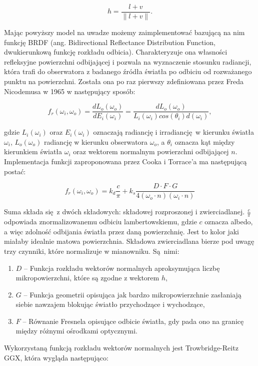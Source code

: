 $$
	h= \frac{l + v}{\|l + v\|}.
	\label{halfway}
$$

	
Mając powyższy model na uwadze możemy zaimplementować bazującą na nim funkcję BRDF (ang. Bidirectional Reflectance Distribution Function, dwukierunkową funkcję rozkładu odbicia). Charakteryzuje ona własności refleksyjne powierzchni odbijającej i pozwala na wyznaczenie stosunku radiancji, która trafi do obserwatora z badanego źródła światła po odbiciu od rozważanego punktu na powierzchni. Została ona po raz pierwszy zdefiniowana przez Freda Nicodemusa w 1965 \cite{Nicodemus} w następujący sposób:

$$
	f_r(\omega_i, \omega_o) = \frac{dL_o(\omega_o)}{dE_i(\omega_i)} = \frac{dL_o(\omega_o)}{L_i(\omega_i) cos(\theta_i) d(\omega_i)},
$$

gdzie $L_i(\omega_i)$ oraz $E_i(\omega_i)$ oznaczają radiancję i irradiancję w kierunku światła $\omega_i$, $L_o(\omega_o)$ radiancję w kierunku obserwatora $\omega_o$, a $\theta_i$ oznacza kąt między kierunkiem światła $\omega_i$ oraz wektorem normalnym powierzchni odbijającej $n$. 
\\ 

Implementacja funkcji zaproponowana przez Cooka i Torrace'a ma następującą postać:

$$
f_r(\omega_i, \omega_o) = k_d \frac{c}{\pi} + k_s\frac{D \cdot F \cdot G}{4\left(\omega_o \cdot n \right) \left( \omega_i \cdot n \right)}
$$

Suma składa się z dwóch składowych: składowej rozproszonej i zwierciadlanej. $\frac{c}{\pi}$ odpowiada znormalizowanemu odbiciu lambertowskiemu, gdzie $c$ oznacza albedo, a więc zdolność odbijania światła przez daną powierzchnię. Jest to kolor jaki miałaby idealnie matowa powierzchnia. Składowa zwierciadlana bierze pod uwagę trzy czynniki, które normalizuje w mianowniku. Są nimi:
\begin{enumerate}
	\item $D$ -- Funkcja rozkładu wektorów normalnych aproksymująca liczbę mikropowierzchni, które są zgodne z wektorem $h$,
	\item $G$ -- Funkcja geometrii opisująca jak bardzo mikropowierzchnie zasłaniają siebie nawzajem blokując światło przychodzące i wychodzące,
	\item $F$ -- Równanie Fresnela opisujące odbicie światła, gdy pada ono na granicę między różnymi ośrodkami optycznymi.
\end{enumerate}

Wykorzystaną funkcją rozkładu wektorów normalnych jest Trowbridge-Reitz GGX, która wygląda następująco:

